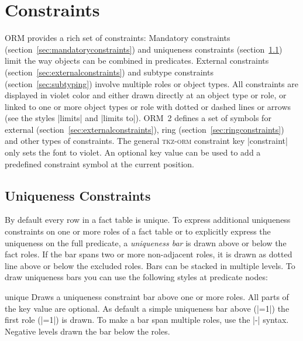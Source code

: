 \documentclass[a4paper,10pt]{article}
\begin{document}
\section{Constraints}
\label{sec:constraints}
ORM provides a rich set of constraints: Mandatory constraints (section~\ref{sec:mandatoryconstraints}) and uniqueness constraints (section~\ref{sec:uniquenessconstraints}) limit the way objects can be combined in predicates. External constraints (section~\ref{sec:externalconstraints}) and subtype constraints (section~\ref{sec:subtyping}) involve multiple roles or object types. All constraints are displayed in violet color and either drawn directly at an object type or role, or linked to one or more object types or role with dotted or dashed lines or arrows (see the styles |limits| and |limits to|). ORM~2 defines a set of symbols for external (section~\ref{sec:externalconstraints}), ring (section~\ref{sec:ringconstraints}) and other types of constraints. The general \textsc{tkz-orm} constraint key |constraint| only sets the font to violet. An optional key value can be used to add a predefined constraint symbol at the current position.


\subsection{Uniqueness Constraints}
\label{sec:uniquenessconstraints}
By default every row in a fact table is unique. To express additional uniqueness constraints on one or more roles of a fact table or to explicitly express the uniqueness on the full predicate, a \emph{uniqueness bar} is drawn above or below the fact roles. If the bar spans two or more non-adjacent roles, it is drawn as dotted line above or below the excluded roles. Bars can be stacked in multiple levels. To draw uniqueness bars you can use the following styles at predicate nodes:

\begin{stylekey}{unique}
Draws a uniqueness constraint bar above one or more roles. All parts of the key value are optional. As default a simple uniqueness bar above (|=1|) the first role (|=1|) is drawn. To make a bar span multiple roles, use the |-| syntax. Negative levels drawn the bar below the roles.
\begin{codeexample}[]
\end{codeexample}
\end{stylekey}
\end{document}
